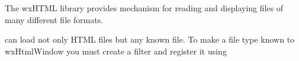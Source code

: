 \label{filters}

The wxHTML library provides mechanism for reading and displaying
files of many different file formats. 

 can load not
only HTML files but any known file. To make a file type known to wxHtmlWindow
you must create a  filter and
register it using 


